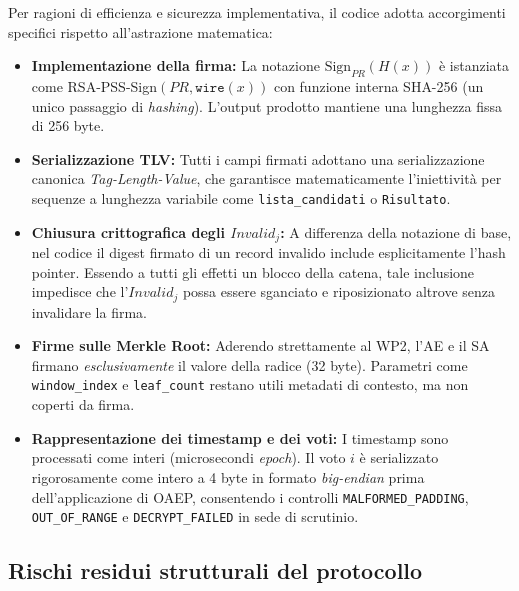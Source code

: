 Per ragioni di efficienza e sicurezza implementativa, il codice adotta accorgimenti specifici rispetto all'astrazione matematica:
\begin{itemize}
  \item \textbf{Implementazione della firma:} La notazione $\mathrm{Sign}_{PR}(H(x))$ è istanziata come RSA-PSS-Sign$(PR, \allowbreak \texttt{wire}(x))$ con funzione interna SHA-256 (un unico passaggio di \emph{hashing}). L'output prodotto mantiene una lunghezza fissa di 256 byte.
  \item \textbf{Serializzazione TLV:} Tutti i campi firmati adottano una serializzazione canonica \emph{Tag-Length-Value}, che garantisce matematicamente l'iniettività per sequenze a lunghezza variabile come \texttt{lista\_candidati} o \texttt{Risultato}.
  \item \textbf{Chiusura crittografica degli $\mathit{Invalid}_j$:} A differenza della notazione di base, nel codice il digest firmato di un record invalido include esplicitamente l'hash pointer. Essendo a tutti gli effetti un blocco della catena, tale inclusione impedisce che l'$\mathit{Invalid}_j$ possa essere sganciato e riposizionato altrove senza invalidare la firma.
  \item \textbf{Firme sulle Merkle Root:} Aderendo strettamente al WP2, l'AE e il SA firmano \emph{esclusivamente} il valore della radice (32 byte). Parametri come \texttt{window\_index} e \texttt{leaf\_count} restano utili metadati di contesto, ma non coperti da firma.
  \item \textbf{Rappresentazione dei timestamp e dei voti:} I timestamp sono processati come interi (microsecondi \emph{epoch}). Il voto $i$ è serializzato rigorosamente come intero a 4 byte in formato \emph{big-endian} prima dell'applicazione di OAEP, consentendo i controlli \texttt{MALFORMED\_PADDING}, \texttt{OUT\_OF\_RANGE} e \texttt{DECRYPT\_FAILED} in sede di scrutinio.
\end{itemize}

\subsection{Rischi residui strutturali del protocollo}
\label{subsec:wp4_rischi_strutturali}

